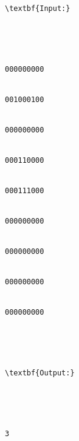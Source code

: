\begin{verbatim}
\textbf{Input:}





000000000 


001000100 


000000000 


000110000 


000111000 


000000000 


000000000 


000000000 


000000000 





\textbf{Output:}





3


\end{verbatim}